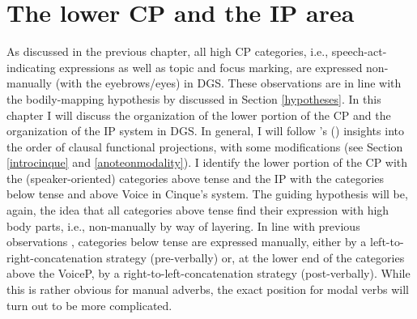 \chapter{The lower CP and the IP area}\label{ipsystem}
As discussed in the previous chapter, all high CP categories, i.e., speech-act-indicating expressions as well as topic and focus marking, are expressed non-manually (with the eyebrows/eyes) in DGS. These observations are in line with the bodily-mapping hypothesis by \citet{bross2017scope} discussed in Section \ref{hypotheses}. In this chapter I will discuss the organization of the lower portion of the CP and the organization of the IP system in DGS. In general, I will follow \citeauthor{cinque1999adverbs}'s (\citeyear{cinque1999adverbs, cinque2006restructuring}) insights into the order of clausal functional projections, with some modifications (see Section \ref{introcinque} and \ref{anoteonmodality}). I identify the lower portion of the CP with the (speaker-oriented) categories above tense and the IP with the categories below tense and above Voice in Cinque's system. The guiding hypothesis will be, again, the idea that all categories above tense find their expression with high body parts, i.e., non-manually by way of layering. In line with previous observations \citep{bross2017scope}, categories below tense are expressed manually, either by a left-to-right-concatenation strategy (pre-verbally) or, at the lower end of the categories above the VoiceP, by a right-to-left-concatenation strategy (post-verbally). While this is rather obvious for manual adverbs, the exact position for modal verbs will turn out to be more complicated. 

